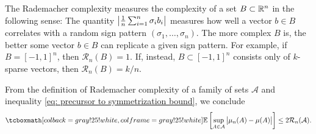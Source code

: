 The Rademacher complexity measures the complexity of a set $B \subset \mathbb{R}^n$ in the following sense: The quantity $\abs{ \frac{1}{n} \sum_{i=1}^n \sigma_i b_i}$ measures how well a vector $b \in B$ correlates with a random sign pattern $(\sigma_1, \dots, \sigma_n)$. The more complex $B$ is, the better some vector $b \in B$ can replicate a given sign pattern. For example, if $B = [-1, 1]^n$, then $\mathcal{R}_n(B) = 1$. If, instead, $B \subset [-1, 1]^n$ consists only of $k$-sparse vectors, then $\mathcal{R}_n(B) = k/n$.

From the definition of Rademacher complexity of a family of sets $\mathcal{A}$ and inequality \eqref{eq: precursor to symmetrization bound}, we conclude
\begin{equation}
\label{eq: symmetrization bound}
    \highlightMath{
        \Ex{\sup_{A \in \mathcal{A}} \bigAbs{ \mu_n(A) - \mu(A) }} \leq 2 \mathcal{R}_n(\mathcal{A}).
    }
\end{equation}
